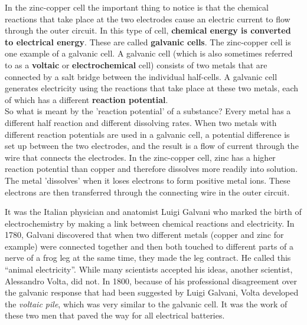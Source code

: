 In the zinc-copper cell the important thing to notice is that the chemical reactions that take place at the two electrodes cause an electric current to flow through the outer circuit. In this type of cell, \textbf{chemical energy is converted to electrical energy}. These are called \textbf{galvanic cells}. The zinc-copper cell is one example of a galvanic cell. A galvanic cell (which is also sometimes referred to as a \textbf{voltaic} or \textbf{electrochemical} cell) consists of two metals that are connected by a salt bridge between the individual half-cells. A galvanic cell generates electricity using the reactions that take place at these two metals, each of which has a different \textbf{reaction potential}.\\

So what is meant by the 'reaction potential' of a substance? Every metal has a different half reaction and different dissolving rates. When two metals with different reaction potentials are used in a galvanic cell, a potential difference is set up between the two electrodes, and the result is a flow of current through the wire that connects the electrodes. In the zinc-copper cell, zinc has a higher reaction potential than copper and therefore dissolves more readily into solution. The metal 'dissolves' when it loses electrons to form positive metal ions. These electrons are then transferred through the connecting wire in the outer circuit. 


\begin{IFact}{It was the Italian physician and anatomist Luigi Galvani who marked the birth of electrochemistry by making a link between chemical reactions and electricity. In 1780, Galvani discovered that when two different metals (copper and zinc for example) were connected together and then both touched to different parts of a nerve of a frog leg at the same time, they made the leg contract. He called this ``animal electricity''. While many scientists accepted his ideas, another scientist, Alessandro Volta, did not. In 1800, because of his professional disagreement over the galvanic response that had been suggested by Luigi Galvani, Volta developed the \textit{voltaic pile}, which was very similar to the galvanic cell. It was the work of these two men that paved the way for all electrical batteries.}
\end{IFact}

